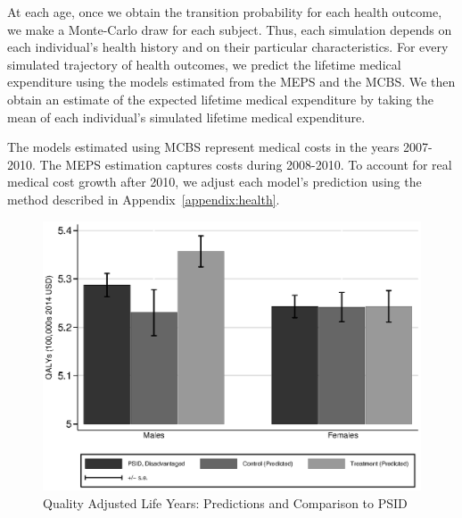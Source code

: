 At each age, once we obtain the transition probability for each health outcome, we make a Monte-Carlo draw for each subject. Thus, each simulation depends on each individual's health history and on their particular characteristics. For every simulated trajectory of health outcomes, we predict the lifetime medical expenditure using the models estimated from the MEPS and the MCBS. We then obtain an estimate of the expected lifetime medical expenditure by taking the mean of each individual's simulated lifetime medical expenditure.

The models estimated using MCBS represent medical costs in the years 2007-2010. The MEPS estimation captures costs during 2008-2010. To account for real medical cost growth after 2010, we adjust each model's prediction using the method described in  Appendix~\ref{appendix:health}.

\begin{figure}[!htbp]
\caption{Quality Adjusted Life Years: Predictions and Comparison to PSID}\label{fig:qalys}
\centering
\includegraphics[width=.7\columnwidth]{output/qalyexppsid.eps}
\end{figure}


